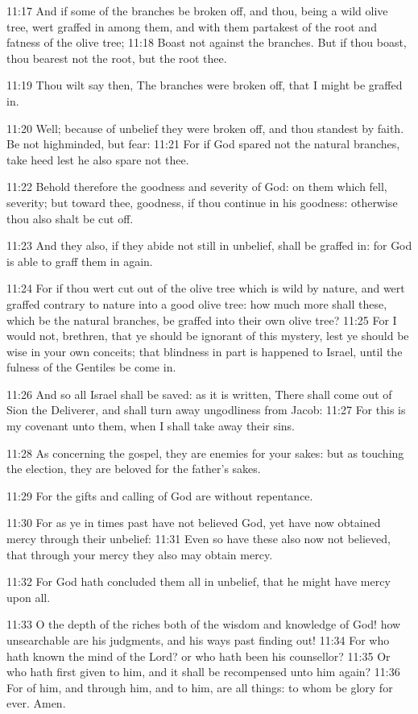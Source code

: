 11:17 And if some of the branches be broken off, and thou, being a wild olive tree, wert graffed in among them, and with them partakest of the root and fatness of the olive tree; 11:18 Boast not against the branches. But if thou boast, thou bearest not the root, but the root thee.

11:19 Thou wilt say then, The branches were broken off, that I might be graffed in.

11:20 Well; because of unbelief they were broken off, and thou standest by faith. Be not highminded, but fear: 11:21 For if God spared not the natural branches, take heed lest he also spare not thee.

11:22 Behold therefore the goodness and severity of God: on them which fell, severity; but toward thee, goodness, if thou continue in his goodness: otherwise thou also shalt be cut off.

11:23 And they also, if they abide not still in unbelief, shall be graffed in: for God is able to graff them in again.

11:24 For if thou wert cut out of the olive tree which is wild by nature, and wert graffed contrary to nature into a good olive tree: how much more shall these, which be the natural branches, be graffed into their own olive tree?  11:25 For I would not, brethren, that ye should be ignorant of this mystery, lest ye should be wise in your own conceits; that blindness in part is happened to Israel, until the fulness of the Gentiles be come in.

11:26 And so all Israel shall be saved: as it is written, There shall come out of Sion the Deliverer, and shall turn away ungodliness from Jacob: 11:27 For this is my covenant unto them, when I shall take away their sins.

11:28 As concerning the gospel, they are enemies for your sakes: but as touching the election, they are beloved for the father's sakes.

11:29 For the gifts and calling of God are without repentance.

11:30 For as ye in times past have not believed God, yet have now obtained mercy through their unbelief: 11:31 Even so have these also now not believed, that through your mercy they also may obtain mercy.

11:32 For God hath concluded them all in unbelief, that he might have mercy upon all.

11:33 O the depth of the riches both of the wisdom and knowledge of God!  how unsearchable are his judgments, and his ways past finding out!  11:34 For who hath known the mind of the Lord? or who hath been his counsellor?  11:35 Or who hath first given to him, and it shall be recompensed unto him again?  11:36 For of him, and through him, and to him, are all things: to whom be glory for ever. Amen.


